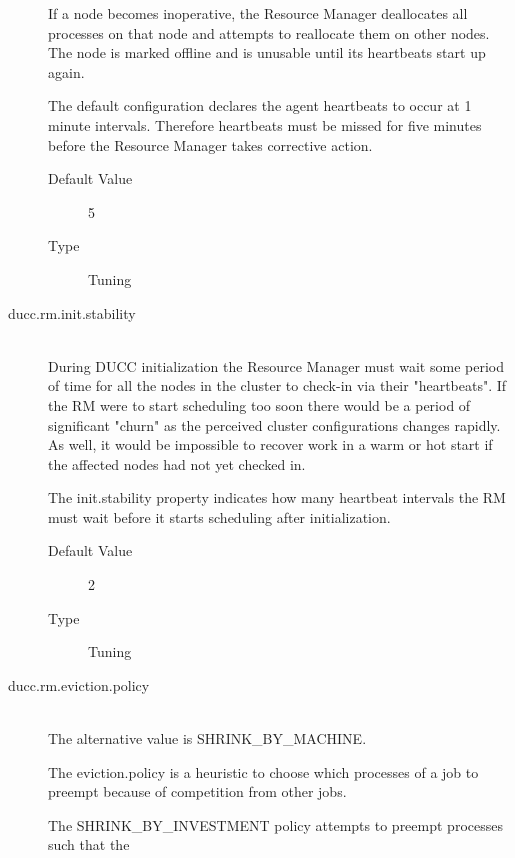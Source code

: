 \begin{description}
          If a node becomes inoperative, the Resource Manager deallocates all processes on that 
          node and attempts to reallocate them on other nodes. The node is marked offline and is 
          unusable until its heartbeats start up again. 
          
          The default configuration declares the agent heartbeats to occur at 1 minute intervals. 
          Therefore heartbeats must be missed for five minutes before the Resource Manager takes 
          corrective action. 
          \begin{description}
            \item[Default Value] 5 
            \item[Type] Tuning 
          \end{description}
          

        \item[ducc.rm.init.stability] \hfill \\
          During DUCC initialization the Resource Manager must wait some period of time for 
          all the nodes in the cluster to check-in via their "heartbeats". If the RM were to start 
          scheduling too soon there would be a period of significant "churn" as the perceived cluster 
          configurations changes rapidly. As well, it would be impossible to recover work in a warm 
          or hot start if the affected nodes had not yet checked in. 
          
          The init.stability property indicates how many heartbeat intervals the RM must wait before 
          it starts scheduling after initialization. 
          \begin{description}            
            \item[Default Value] 2
            \item[Type] Tuning 
          \end{description}
          
        \item[ducc.rm.eviction.policy] \hfill \\
          The alternative value is SHRINK\_BY\_MACHINE. 

          The eviction.policy is a heuristic to choose which processes of a job to preempt because of 
          competition from other jobs. 
          
          The SHRINK\_BY\_INVESTMENT policy attempts to preempt processes such that the 
          

\end{description}
